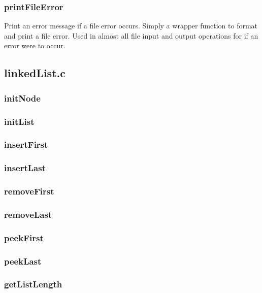 \documentclass[a4paper, 12pt, titlepage]{article}
\begin{document}
\subsubsection{printFileError}

Print an error message if a file error occurs. Simply a wrapper function to 
format and print a file error. Used in almost all file input and output 
operations for if an error were to occur.

\subsection{linkedList.c}
\subsubsection{initNode}

\subsubsection{initList}

\subsubsection{insertFirst}

\subsubsection{insertLast}

\subsubsection{removeFirst}

\subsubsection{removeLast}

\subsubsection{peekFirst}

\subsubsection{peekLast}

\subsubsection{getListLength}
\end{document}
